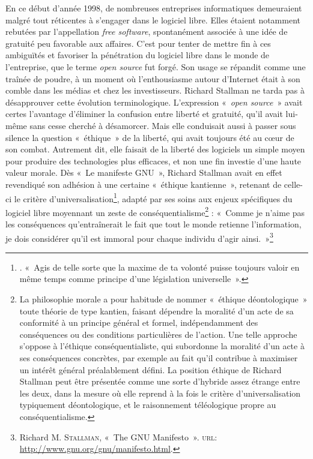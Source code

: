 \documentclass{FramateX}
\begin{document}
\begin{refsection}
En ce début d'année 1998, de nombreuses entreprises informatiques
demeuraient malgré tout réticentes à s'engager dans le logiciel libre.
Elles étaient notamment rebutées par l'appellation \textit{free
software}, spontanément associée à une idée de gratuité peu favorable
aux affaires. C'est pour tenter de mettre fin à ces ambiguïtés et
favoriser la pénétration du logiciel libre dans le monde de
l'entreprise, que le terme \textit{open source} fut forgé. Son usage se
répandit comme une traînée de poudre, à un moment où l'enthousiasme
autour d'Internet était à son comble dans les médias et chez les
investisseurs. Richard Stallman ne tarda pas à désapprouver cette
évolution terminologique. L'expression «~\textit{open source}~» avait
certes l'avantage d'éliminer la confusion entre liberté et gratuité,
qu'il avait lui-même sans cesse cherché à désamorcer.
Mais elle conduisait aussi à passer sous silence la question
«~éthique~» de la liberté, qui avait toujours été au cœur de son
combat. Autrement dit, elle faisait de la liberté des logiciels un
simple moyen pour produire des technologies plus efficaces, et non une
fin investie d'une haute valeur morale. Dès «~Le
manifeste GNU~», Richard Stallman avait en effet revendiqué son
adhésion à une certaine «~éthique kantienne~», retenant de celle-ci le
critère d'universalisation\footnote{\cite[p.~30]{Kant1993}. «~Agis de telle sorte que la maxime de ta volonté puisse toujours valoir en même temps comme principe d'une législation universelle~».}, adapté par ses soins aux enjeux spécifiques du logiciel libre moyennant un
zeste de conséquentialisme\footnote{La philosophie morale a pour
habitude de nommer «~éthique déontologique~» toute théorie de type
kantien, faisant dépendre la moralité d'un acte de sa conformité à un
principe général et formel, indépendamment des conséquences ou des
conditions particulières de l'action. Une telle approche s'oppose à
l'éthique conséquentialiste, qui subordonne la moralité d'un acte à ses
conséquences concrètes, par exemple au fait qu'il contribue à maximiser
un intérêt général préalablement défini. La position éthique de Richard
Stallman peut être présentée comme une sorte d'hybride assez étrange
entre les deux, dans la mesure où elle reprend à la fois le critère
d'universalisation typiquement déontologique, et le raisonnement
téléologique propre au conséquentialisme.} : «~Comme je n'aime pas les
conséquences qu'entraînerait le fait que tout le monde retienne
l'information, je dois considérer qu'il est immoral pour chaque
individu d'agir ainsi.~»\footnote{Richard M. \textsc{Stallman}, «~The GNU
Manifesto~». \textsc{url}: \url{http://www.gnu.org/gnu/manifesto.html}.}


\end{refsection}
\end{document}
